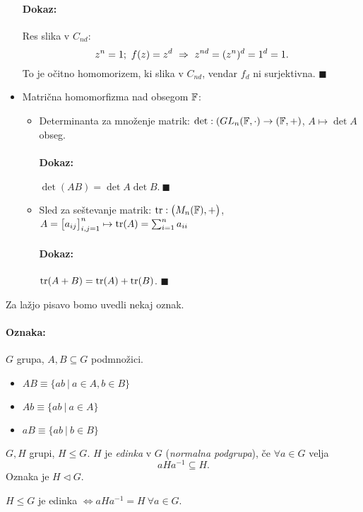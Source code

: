 \begin{itemize}
{		\paragraph{Dokaz:} Res slika v $C_{nd}$:
		\[
			z^n = 1;\ f(z) = z^d\ \Rightarrow\ z^{nd} = (z^n)^d = 1^d = 1.
		\] To je o\v citno homomorizem, ki slika v $C_{nd}$, vendar $f_d$ ni surjektivna. $\blacksquare$}
	\item{Matri\v cna homomorfizma nad obsegom $\mathbb{F}$:
		\begin{itemize}
			\item{Determinanta za mno\v zenje matrik: $\det: (GL_n (\mathbb{F}, \cdot) \to (\mathbb{F}, +)$, $A \mapsto \det A$ obseg.
				\paragraph{Dokaz:} $\det (AB) = \det A \det B.\ \blacksquare$}
			\item{Sled za se\v stevanje matrik: $\operatorname{tr} : \big(M_n(\mathbb{F}), +\big)$, $A = \big[a_{ij}\big]^n_{i,j = 1} \mapsto \operatorname{tr} (A) = \sum_{i=1}^n a_{ii}$
				\paragraph{Dokaz:} $\operatorname{tr}(A + B) = \operatorname{tr}(A) + \operatorname{tr}(B)$. $\blacksquare$}
		\end{itemize}}
\end{itemize}

\ni Za la\v zjo pisavo bomo uvedli nekaj oznak.

\paragraph{Oznaka:} $G$ grupa, $A,B \subseteq G$ podmno\v zici.
\begin{itemize}
	\item{$AB \equiv \{ab\ |\ a \in A, b \in B\}$}
	\item{$Ab \equiv \{ab\ |\ a \in A\}$}
	\item{$aB \equiv \{ab\ |\ b \in B\}$}
\end{itemize}

\begin{defin}
	$G, H$ grupi, $H \leq G$. $H$ je \emph{edinka} v $G$ (\emph{normalna podgrupa}), \v ce $\forall a \in G$ velja
	\[
		a H a^{-1} \subseteq H.
	\]
	Oznaka je $H \lhd G$.
\end{defin}

\begin{lema}
	$H \leq G$ je edinka $\iff a H a^{-1} = H\ \forall a \in G$.
\end{lema}

